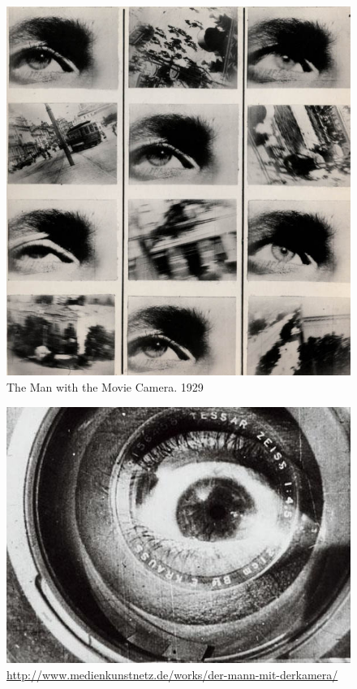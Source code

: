 \documentclass[
  french,
]{book}
\begin{document}
\begin{figure}
\centering
\includegraphics{medias/corpus/vertov/ManWAMovieCamera_1929_DzigaVertov.jpg}
\caption{The Man with the Movie Camera. 1929}
\end{figure}

\begin{figure}
\centering
\includegraphics{medias/corpus/vertov/bild.jpg}
\caption{\url{http://www.medienkunstnetz.de/works/der-mann-mit-derkamera/}}
\end{figure}
\end{document}
